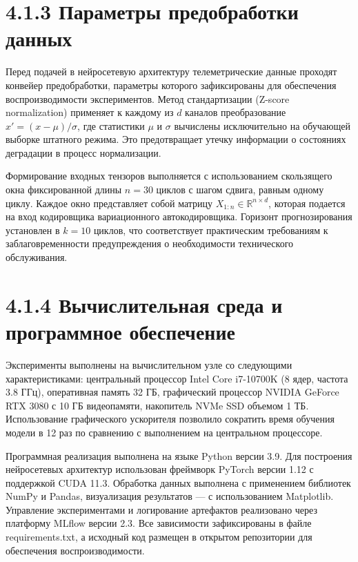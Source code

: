 \documentclass[14pt, a4paper, oneside]{extreport}
\begin{document}
\section{4.1.3 Параметры предобработки данных}
\vspace{1em}

Перед подачей в нейросетевую архитектуру телеметрические данные проходят конвейер предобработки, параметры которого зафиксированы для обеспечения воспроизводимости экспериментов. Метод стандартизации (Z-score normalization) применяет к каждому из $d$ каналов преобразование $x' = (x - \mu) / \sigma$, где статистики $\mu$ и $\sigma$ вычислены исключительно на обучающей выборке штатного режима. Это предотвращает утечку информации о состояниях деградации в процесс нормализации.

Формирование входных тензоров выполняется с использованием скользящего окна фиксированной длины $n = 30$ циклов с шагом сдвига, равным одному циклу. Каждое окно представляет собой матрицу $X_{1:n} \in \mathbb{R}^{n \times d}$, которая подается на вход кодировщика вариационного автокодировщика. Горизонт прогнозирования установлен в $k = 10$ циклов, что соответствует практическим требованиям к заблаговременности предупреждения о необходимости технического обслуживания.

\vspace{1em}
\section{4.1.4 Вычислительная среда и программное обеспечение}
\vspace{1em}

Эксперименты выполнены на вычислительном узле со следующими характеристиками: центральный процессор Intel Core i7-10700K (8 ядер, частота 3.8 ГГц), оперативная память 32 ГБ, графический процессор NVIDIA GeForce RTX 3080 с 10 ГБ видеопамяти, накопитель NVMe SSD объемом 1 ТБ. Использование графического ускорителя позволило сократить время обучения модели в 12 раз по сравнению с выполнением на центральном процессоре.

Программная реализация выполнена на языке Python версии 3.9. Для построения нейросетевых архитектур использован фреймворк PyTorch версии 1.12 с поддержкой CUDA 11.3. Обработка данных выполнена с применением библиотек NumPy и Pandas, визуализация результатов — с использованием Matplotlib. Управление экспериментами и логирование артефактов реализовано через платформу MLflow версии 2.3. Все зависимости зафиксированы в файле requirements.txt, а исходный код размещен в открытом репозитории для обеспечения воспроизводимости.
\end{document}
